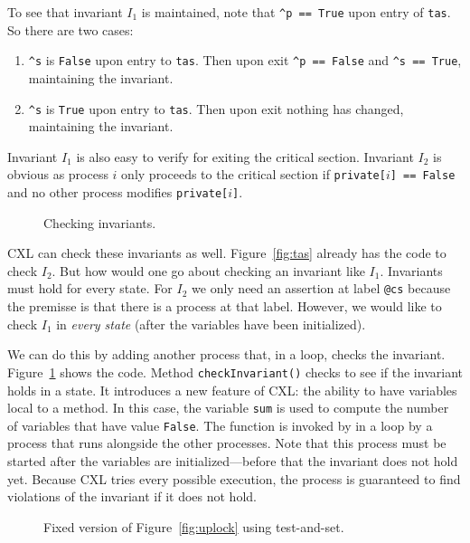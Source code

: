\documentclass{report}
\newenvironment{code}{
\tcolorbox
}{
\endtcolorbox
}
\begin{document}
To see that invariant $I_1$ is maintained, note that
\texttt{\^{}p == True} upon entry of \texttt{tas}.
So there are two cases:
\begin{enumerate}
\item \texttt{\^{}s} is \texttt{False} upon entry to \texttt{tas}.
Then upon exit \texttt{\^{}p == False} and \texttt{\^{}s == True}, maintaining
the invariant.
\item \texttt{\^{}s} is \texttt{True} upon entry to \texttt{tas}.
Then upon exit nothing has changed, maintaining the invariant.
\end{enumerate}
Invariant $I_1$ is also easy to verify for exiting the critical section.
Invariant $I_2$ is obvious as process $i$ only proceeds to the critical
section if \texttt{private[$i$] == False} and no other process modifies
\texttt{private[$i$]}.

\begin{figure}
\begin{code}

\end{code}
\caption{Checking invariants.}
\label{fig:tasinv}
\end{figure}

CXL can check these invariants as well.  Figure~\ref{fig:tas} already
has the code to check $I_2$.  But how would one go about checking an
invariant like $I_1$.  Invariants must hold for every state.
For $I_2$ we only need an assertion at label \texttt{@cs} because the
premisse is that there is a process at that label.  However, we would
like to check $I_1$ in \emph{every state} (after the variables have
been initialized).

We can do this by adding another process that, in a loop,
checks the invariant.  Figure~\ref{fig:tasinv} shows the code.
Method \texttt{checkInvariant()} checks to see if the invariant holds
in a state.  It introduces a new feature of CXL: the ability to have
variables local to a method.  In this case, the variable \texttt{sum}
is used to compute the number of variables that have value
\texttt{False}.
The function is invoked by in a loop by a process that runs alongside
the other processes.
Note that this process must be started after the variables are
initialized---before that the invariant does not hold yet.
Because CXL tries every possible execution, the process is guaranteed
to find violations of the invariant if it does not hold.

\begin{figure}
\begin{code}

\end{code}
\caption{Fixed version of Figure~\ref{fig:uplock} using test-and-set.}
\label{fig:tas2}
\end{figure}
\end{document}
